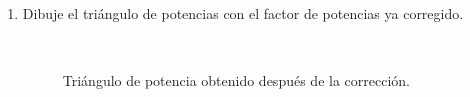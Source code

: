 \documentclass[12pt,a4paper]{article}
\begin{document}
\begin{enumerate}
    Cálculo de la potencia aparente y reactiva:
    \begin{align*}
        S &= V_{RMS}I_{RMS} = (\SI{124}{\volt})(\SI{2.16}{\ampere})=\SI{267.8}{\volt\ampere},\\
        Q &= \sqrt{S^2-P^2}=\sqrt{{(\SI{267.8}{\volt\ampere})}^2-{(\SI{267.5}{\watt})}^2}=\SI{12.67}{\volt\ampere{R}}.
    \end{align*}

    \item Dibuje el triángulo de potencias con el factor de potencias ya corregido.
    \begin{figure}[H]
        \centering
        \caption{Triángulo de potencia obtenido después de la corrección.}~\label{fig:p5-triangulo-corregido}
    \end{figure}
\end{enumerate}
\end{document}
